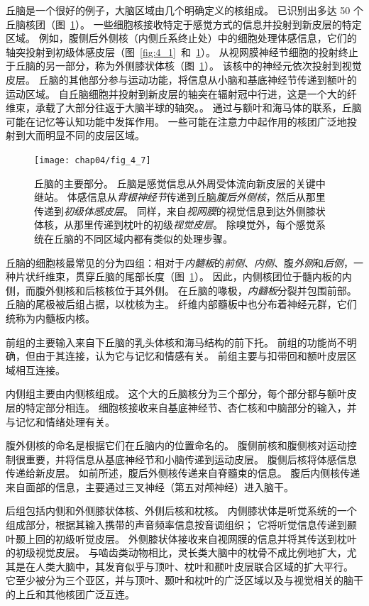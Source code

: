 丘脑是一个很好的例子，大脑区域由几个明确定义的核组成。
已识别出多达 50 个丘脑核团（图~\ref{fig:4_7}）。
一些细胞核接收特定于感觉方式的信息并投射到新皮层的特定区域。
例如，腹侧后外侧核（内侧丘系终止处）中的细胞处理体感信息，它们的轴突投射到初级体感皮层（图~\ref{fig:4_1}~和~\ref{fig:4_7}）。 
从视网膜神经节细胞的投射终止于丘脑的另一部分，称为外侧膝状体核（图~\ref{fig:4_7}）。 
该核中的神经元依次投射到视觉皮层。 
丘脑的其他部分参与运动功能，将信息从小脑和基底神经节传递到额叶的运动区域。 
自丘脑细胞并投射到新皮层的轴突在辐射冠中行进，这是一个大的纤维束，承载了大部分往返于大脑半球的轴突。。 
通过与额叶和海马体的联系，丘脑可能在记忆等认知功能中发挥作用。 
一些可能在注意力中起作用的核团广泛地投射到大而明显不同的皮层区域。


\begin{figure}[htbp]
	\centering
	\texttt{[image: chap04/fig\_4\_7]}
	\caption{丘脑的主要部分。
		丘脑是感觉信息从外周受体流向新皮层的关键中继站。
		体感信息从\textit{背根神经节}传递到丘脑\textit{腹后外侧核}，然后从那里传递到\textit{初级体感皮层}。
		同样，来自\textit{视网膜}的视觉信息到达外侧膝状体核，从那里传递到枕叶的初级\textit{视觉皮层}。
		除嗅觉外，每个感觉系统在丘脑的不同区域内都有类似的处理步骤。}
	\label{fig:4_7}
\end{figure}


丘脑的细胞核最常见的分为四组：相对于\textit{内髓板}的\textit{前侧}、\textit{内侧}、腹\textit{外侧}和\textit{后侧}，一种片状纤维束，贯穿丘脑的尾部长度（图~\ref{fig:4_7}）。
因此，内侧核团位于髓内板的内侧，而腹外侧核和后核核位于其外侧。
在丘脑的喙极，\textit{内髓板}分裂并包围前部。
丘脑的尾极被后组占据，以枕核为主。
纤维内部髓板中也分布着神经元群，它们统称为内髓板内核。


前组的主要输入来自下丘脑的乳头体核和海马结构的前下托。 
前组的功能尚不明确，但由于其连接，认为它与记忆和情感有关。
前组主要与扣带回和额叶皮层区域相互连接。


内侧组主要由内侧核组成。 
这个大的丘脑核分为三个部分，每个部分都与额叶皮层的特定部分相连。 
细胞核接收来自基底神经节、杏仁核和中脑部分的输入，并与记忆和情绪处理有关。


腹外侧核的命名是根据它们在丘脑内的位置命名的。 
腹侧前核和腹侧核对运动控制很重要，并将信息从基底神经节和小脑传递到运动皮层。
腹侧后核将体感信息传递给新皮层。
如前所述，腹后外侧核传递来自脊髓束的信息。
腹后内侧核传递来自面部的信息，主要通过三叉神经（第五对颅神经）进入脑干。


后组包括内侧和外侧膝状体核、外侧后核和枕核。 
内侧膝状体是听觉系统的一个组成部分，根据其输入携带的声音频率信息按音调组织； 它将听觉信息传递到颞叶颞上回的初级听觉皮层。 
外侧膝状体接收来自视网膜的信息并将其传送到枕叶的初级视觉皮层。 
与啮齿类动物相比，灵长类大脑中的枕骨不成比例地扩大，尤其是在人类大脑中，其发育似乎与顶叶、枕叶和颞叶皮层联合区域的扩大平行。 
它至少被分为三个亚区，并与顶叶、颞叶和枕叶的广泛区域以及与视觉相关的脑干的上丘和其他核团广泛互连。


